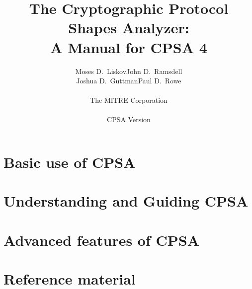 \documentclass[11pt]{report}
\title{The Cryptographic Protocol Shapes Analyzer:\\ A Manual for CPSA
  4}
\author{Moses D.~Liskov\qquad John D.~Ramsdell\\Joshua D.~Guttman\qquad Paul D.~Rowe\\ \\
  {\Large The MITRE Corporation}\\ \\ CPSA Version \version}
\newif\ifpubrel
\begin{document}
\ifpubrel
\thispagestyle{title}
\fi
\maketitle
\ifpubrel
\thispagestyle{title}
\fi
{}
\cpsacopying

\tableofcontents

\listoffigures

\listoftables

\newpage
{}
\setcounter{page}{1}


\part{Basic use of CPSA}
\label{part:basic}



\part{Understanding and Guiding CPSA}
\label{part:intermediate}


\part{Advanced features of CPSA}
\label{part:advanced}


%

\part{Reference material}
\label{part:reference}







\printindex

\newpage 

\end{document}
